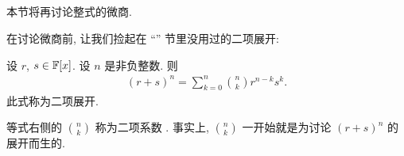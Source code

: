 \subsection*{\DerivativesRevisited}
\markright{\DerivativesRevisited}

本节将再讨论整式的微商.

在讨论微商前, 让我们捡起在 ``\GeneralizedBinomialCoefficients'' 节里没用过的二项展开:

\begin{proposition}
    设 $r$, $s \in \mathbb{F}[x]$. 设 $n$ 是非负整数. 则
    \begin{align*}
        (r + s)^{n} = \sum_{k = 0}^{n} \binom{n}{k} r^{n - k} s^{k}.
    \end{align*}
    此式称为二项展开.
\end{proposition}

\begin{remark}
    等式右侧的 $\binom{n}{k}$ 称为二项系数 . 事实上, $\binom{n}{k}$ 一开始就是为讨论 $(r+s)^n$ 的展开而生的.
\end{remark}

